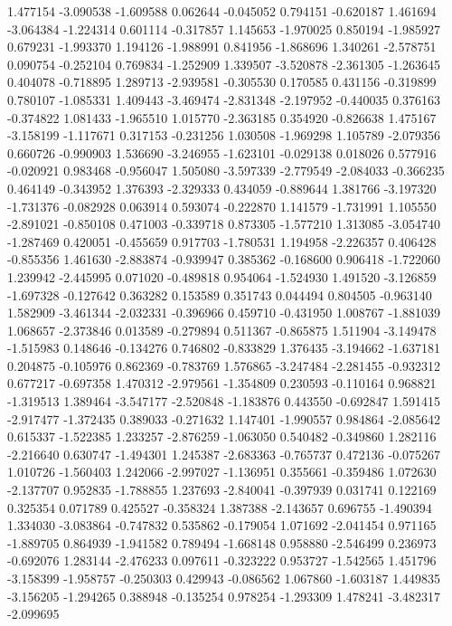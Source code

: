 1.477154
-3.090538
-1.609588
0.062644
-0.045052
0.794151
-0.620187
1.461694
-3.064384
-1.224314
0.601114
-0.317857
1.145653
-1.970025
0.850194
-1.985927
0.679231
-1.993370
1.194126
-1.988991
0.841956
-1.868696
1.340261
-2.578751
0.090754
-0.252104
0.769834
-1.252909
1.339507
-3.520878
-2.361305
-1.263645
0.404078
-0.718895
1.289713
-2.939581
-0.305530
0.170585
0.431156
-0.319899
0.780107
-1.085331
1.409443
-3.469474
-2.831348
-2.197952
-0.440035
0.376163
-0.374822
1.081433
-1.965510
1.015770
-2.363185
0.354920
-0.826638
1.475167
-3.158199
-1.117671
0.317153
-0.231256
1.030508
-1.969298
1.105789
-2.079356
0.660726
-0.990903
1.536690
-3.246955
-1.623101
-0.029138
0.018026
0.577916
-0.020921
0.983468
-0.956047
1.505080
-3.597339
-2.779549
-2.084033
-0.366235
0.464149
-0.343952
1.376393
-2.329333
0.434059
-0.889644
1.381766
-3.197320
-1.731376
-0.082928
0.063914
0.593074
-0.222870
1.141579
-1.731991
1.105550
-2.891021
-0.850108
0.471003
-0.339718
0.873305
-1.577210
1.313085
-3.054740
-1.287469
0.420051
-0.455659
0.917703
-1.780531
1.194958
-2.226357
0.406428
-0.855356
1.461630
-2.883874
-0.939947
0.385362
-0.168600
0.906418
-1.722060
1.239942
-2.445995
0.071020
-0.489818
0.954064
-1.524930
1.491520
-3.126859
-1.697328
-0.127642
0.363282
0.153589
0.351743
0.044494
0.804505
-0.963140
1.582909
-3.461344
-2.032331
-0.396966
0.459710
-0.431950
1.008767
-1.881039
1.068657
-2.373846
0.013589
-0.279894
0.511367
-0.865875
1.511904
-3.149478
-1.515983
0.148646
-0.134276
0.746802
-0.833829
1.376435
-3.194662
-1.637181
0.204875
-0.105976
0.862369
-0.783769
1.576865
-3.247484
-2.281455
-0.932312
0.677217
-0.697358
1.470312
-2.979561
-1.354809
0.230593
-0.110164
0.968821
-1.319513
1.389464
-3.547177
-2.520848
-1.183876
0.443550
-0.692847
1.591415
-2.917477
-1.372435
0.389033
-0.271632
1.147401
-1.990557
0.984864
-2.085642
0.615337
-1.522385
1.233257
-2.876259
-1.063050
0.540482
-0.349860
1.282116
-2.216640
0.630747
-1.494301
1.245387
-2.683363
-0.765737
0.472136
-0.075267
1.010726
-1.560403
1.242066
-2.997027
-1.136951
0.355661
-0.359486
1.072630
-2.137707
0.952835
-1.788855
1.237693
-2.840041
-0.397939
0.031741
0.122169
0.325354
0.071789
0.425527
-0.358324
1.387388
-2.143657
0.696755
-1.490394
1.334030
-3.083864
-0.747832
0.535862
-0.179054
1.071692
-2.041454
0.971165
-1.889705
0.864939
-1.941582
0.789494
-1.668148
0.958880
-2.546499
0.236973
-0.692076
1.283144
-2.476233
0.097611
-0.323222
0.953727
-1.542565
1.451796
-3.158399
-1.958757
-0.250303
0.429943
-0.086562
1.067860
-1.603187
1.449835
-3.156205
-1.294265
0.388948
-0.135254
0.978254
-1.293309
1.478241
-3.482317
-2.099695
